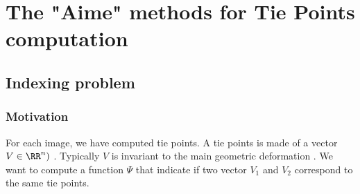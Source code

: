 

\chapter{The "Aime" methods for Tie Points computation}




\section{Indexing problem}


\subsection{Motivation}
For each image, we have computed tie points. A tie points is made
of a vector $V \in \RR^n)$ . Typically $V$ is invariant
to the main geometric deformation .  We want to compute 
a function $\Psi $ that indicate if two vector $V_1$ and $V_2$
correspond to the same tie points.



